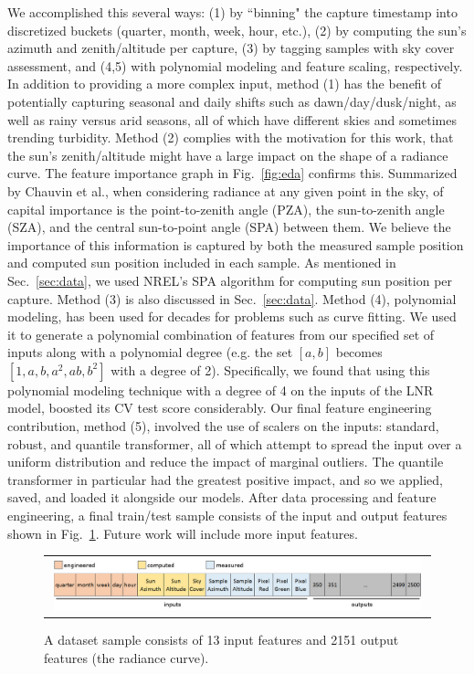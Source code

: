 We accomplished this several ways: (1) by ``binning" the capture timestamp into discretized buckets (quarter, month, week, hour, etc.), (2) by computing the sun's azimuth and zenith/altitude per capture, (3) by tagging samples with sky cover assessment, and (4,5) with polynomial modeling and feature scaling, respectively. In addition to providing a more complex input, method (1) has the benefit of potentially capturing seasonal and daily shifts such as dawn/day/dusk/night, as well as rainy versus arid seasons, all of which have different skies and sometimes trending turbidity.\cite{power_seasonal} Method (2) complies with the motivation for this work, that the sun's zenith/altitude might have a large impact on the shape of a radiance curve. The feature importance graph in Fig.~\ref{fig:eda} confirms this. Summarized by Chauvin et al., when considering radiance at any given point in the sky, of capital importance is the point-to-zenith angle (PZA), the sun-to-zenith angle (SZA), and the central sun-to-point angle (SPA) between them.\cite{chauvin_modelling_2015} We believe the importance of this information is captured by both the measured sample position and computed sun position included in each sample. As mentioned in Sec.~\ref{sec:data}, we used NREL's SPA algorithm for computing sun position per capture.\cite{reda_spa} Method (3) is also discussed in Sec.~\ref{sec:data}. Method (4), polynomial modeling, has been used for decades for problems such as curve fitting.\cite{deboor_splines} We used it to generate a polynomial combination of features from our specified set of inputs along with a polynomial degree (e.g. the set $[a, b]$ becomes $[1, a, b, a^2, ab, b^2]$ with a degree of 2).\cite{pedregosa_scikit} Specifically, we found that using this polynomial modeling technique with a degree of 4 on the inputs of the LNR model, boosted its CV test score considerably. Our final feature engineering contribution, method (5), involved the use of scalers on the inputs: standard, robust, and quantile transformer,\cite{pedregosa_scikit} all of which attempt to spread the input over a uniform distribution and reduce the impact of marginal outliers.\cite{pedregosa_scikit} The quantile transformer in particular had the greatest positive impact, and so we applied, saved, and loaded it alongside our models. After data processing and feature engineering, a final train/test sample consists of the input and output features shown in Fig.~\ref{fig:features}. Future work will include more input features.

\begin{figure} [b]
\begin{center}
\begin{tabular}{c}
\includegraphics[width=0.98\textwidth]{img/features.jpg}
\end{tabular}
\end{center}
\caption[features] {\label{fig:features}A dataset sample consists of 13 input features and 2151 output features (the radiance curve).}
\end{figure}

